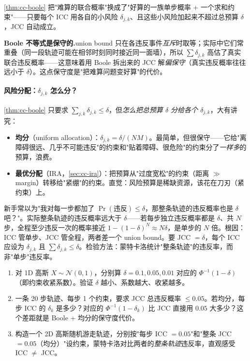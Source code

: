 \cref{thm:cc-boole} 把"难算的联合概率"换成了"好算的一族单步概率 + 一个求和约束"——只要每个 ICC 用各自的小风险 $\delta_{j,k}$、且这些小风险加起来不超过总预算 $\delta$，JCC 自动成立。

\begin{note}
\textbf{Boole 不等式是保守的.}\;union bound 只在各违反事件\emph{互斥}时取等；实际中它们常重叠（同一段轨迹可能在相邻时刻同时接近同一面墙），所以 $\sum\delta_{j,k}$ 高估了真实联合违反概率——这意味着用 Boole 拆出来的 JCC 解\emph{偏保守}（真实违反概率往往远小于 $\delta$）。这点保守度是"把难算问题变好算"的代价。
\end{note}

\paragraph{风险分配：$\delta_{j,k}$ 怎么分？}
\cref{thm:cc-boole} 只要求 $\sum_{j,k}\delta_{j,k}\le\delta$，但\emph{怎么把总预算 $\delta$ 分给各个 $\delta_{j,k}$}，大有讲究：
\begin{itemize}
  \item \textbf{均分}（uniform allocation）：$\delta_{j,k}=\delta/(NM)$。最简单，但很保守——它给"离障碍很远、几乎不可能违反"的约束和"贴着障碍、很危险"的约束分了\emph{一样多}的预算，浪费。
  \item \textbf{最优分配}（IRA，\cref{sec:cc-ira}）：把预算从"过度宽松"的约束（距离 $\gg$ margin）转移给"紧绷"的约束。直觉：风险预算是稀缺资源，该花在刀刃（紧约束）上。
\end{itemize}

\begin{pitfall}
新手常以为"我对每一步都加了 $\Pr(\text{违反})\le\delta$，那整条轨迹的违反概率也是 $\delta$ 吧？"。实际整条轨迹的违反概率远大于 $\delta$——若每步独立违反概率都是 $\delta$、共 $N$ 步，全程至少违反一次的概率接近 $1-(1-\delta)^N\approx N\delta$，是单步的 $N$ 倍。根因：ICC 管单步、JCC 管全程，两者差一个 union bound。要 JCC $=\delta$，每个 ICC 应设为 $\delta_{j,k}$ 且 $\sum\delta_{j,k}\le\delta$。检验方法：蒙特卡洛统计"整条轨迹"的违反率，而非"单步"违反率。
\end{pitfall}

\begin{practice}
\begin{enumerate}
  \item 对 1D 高斯 $X\sim\mathcal{N}(0,1)$，分别算 $\delta=0.1,0.05,0.01$ 对应的 $\Phi^{-1}(1-\delta)$（即约束收紧系数）。验证 $\delta$ 越小、系数越大、收紧越多。
  \item 一条 20 步轨迹、每步 1 个约束，要求 JCC 总违反概率 $\le0.05$。若均分，每步 ICC 的 $\delta_k$ 是多少？对应的 $\Phi^{-1}(1-\delta_k)$ 比 JCC 直接用 $0.05$ 大多少？这个差距就是 Boole + 均分的保守度代价。
  \item 构造一个 2D 高斯随机游走轨迹，分别按"每步 ICC $=0.05$"和"整条 JCC $=0.05$（均分）"设约束，蒙特卡洛对比两者的\emph{整条轨迹}违反率，直观感受 ICC $\neq$ JCC。
\end{enumerate}
\end{practice}

